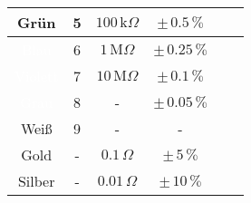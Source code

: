 \begin{frame}
{\begin{figure}[H]
\begin{minipage}[b]{1\textwidth}
{\begin{tabular}{|c|c|c|c|c|c|}
                \hline %
                \cellcolor{green}Grün & 5 & $100\,\text{k}\Omega$ & $\pm\, 0.5\,\%$ \\ %
                \hline %
                \cellcolor{blue}\textcolor{white}{Blau}& 6 & $1\,\text{M}\Omega$ & $\pm\, 0.25\,\%$ \\ %
                \hline %
                \cellcolor{violet}\textcolor{white}{Violett} & 7 & $10\,\text{M}\Omega$ & $\pm\, 0.1\,\%$ \\ %
                \hline %
                \cellcolor{gray}\textcolor{white}{Grau} & 8 & - & $\pm\, 0.05\,\%$ \\ %
                \hline %
                Weiß & 9 & - & - \\ %
                \hline %
                \cellcolor{gold}Gold & - & $0.1\,\Omega$ & $\pm\,5\,\%$ \\ %
                \hline %
                \cellcolor{silver}Silber & - & $0.01\,\Omega$ & $\pm\,10\,\%$ \\ %
                \hline %
            \end{tabular}%
            }
        \end{minipage}
    \end{figure}


}
\end{frame}
